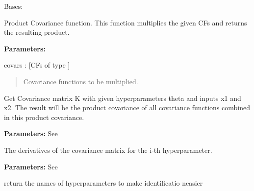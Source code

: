 \documentclass[letterpaper,10pt,english]{sphinxmanual}
\begin{document}

\begin{fulllineitems}
\label{covars:pygp.covar.combinators.ProductCF}
Bases: 

Product Covariance function. This function multiplies
the given CFs and returns the resulting product.

\textbf{Parameters:}

covars : {[}CFs of type {\hyperref[covars:pygp.covar.CovarianceFunction]{}}{]}
\begin{quote}

Covariance functions to be multiplied.
\end{quote}

\begin{fulllineitems}
\label{covars:pygp.covar.combinators.ProductCF.K}
Get Covariance matrix K with given hyperparameters
theta and inputs x1 and x2. The result
will be the product covariance of all covariance
functions combined in this product covariance.

\textbf{Parameters:}
See {\hyperref[covars:pygp.covar.CovarianceFunction]{}}

\end{fulllineitems}


\begin{fulllineitems}
\label{covars:pygp.covar.combinators.ProductCF.Kgrad_theta}
The derivatives of the covariance matrix for
the i-th hyperparameter.

\textbf{Parameters:}
See {\hyperref[covars:pygp.covar.CovarianceFunction]{}}

\end{fulllineitems}


\begin{fulllineitems}
\label{covars:pygp.covar.combinators.ProductCF.get_hyperparameter_names}
return the names of hyperparameters to make identificatio neasier

\end{fulllineitems}


\end{fulllineitems}
\end{document}

